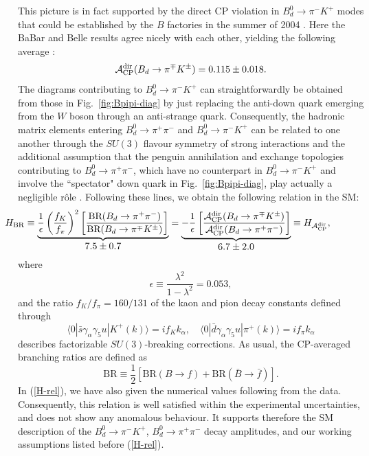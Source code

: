 \documentclass[11pt]{cernrep}
\begin{document}
This picture is in fact supported by the direct CP violation in $B^0_d\to\pi^-K^+$ 
modes that could be established by the $B$ factories in 
the summer of 2004 \cite{CP-B-dir}. Here the BaBar and Belle results agree 
nicely with each other, yielding the following average \cite{HFAG}:
\begin{equation}\label{AdirBdpimKp-exp}
{\cal A}_{\rm CP}^{\rm dir}(B_d\to\pi^\mp K^\pm)=0.115\pm 0.018.
\end{equation}
The diagrams contributing to $B^0_d\to\pi^-K^+$ can straightforwardly be 
obtained from those in Fig.~\ref{fig:Bpipi-diag} by just replacing the anti-down quark
emerging from the $W$ boson through an anti-strange quark. Consequently, the 
hadronic matrix elements entering $B^0_d\to\pi^+\pi^-$ and $B^0_d\to\pi^-K^+$ can be 
related to one another through the $SU(3)$ flavour symmetry of strong interactions
and the additional assumption that the penguin annihilation and exchange topologies
contributing to $B^0_d\to\pi^+\pi^-$, which have no counterpart in 
$B^0_d\to\pi^-K^+$ and involve the ``spectator" down quark in 
Fig.~\ref{fig:Bpipi-diag}, play actually a negligible r\^ole \cite{RF-Bpipi}. Following 
these lines, we obtain the following relation in the SM:
\begin{equation}\label{H-rel}
\hspace*{-1.7truecm}
H_{\rm BR}\equiv\underbrace{\frac{1}{\epsilon}
\left(\frac{f_K}{f_\pi}\right)^2\left[\frac{\mbox{BR}
(B_d\to\pi^+\pi^-)}{\mbox{BR}(B_d\to\pi^\mp K^\pm)}
\right]}_{\mbox{$7.5\pm 0.7$}} =
\underbrace{-\frac{1}{\epsilon}\left[\frac{{\cal A}_{\rm CP}^{\rm dir}(B_d\to\pi^\mp 
K^\pm)}{{\cal A}_{\rm CP}^{\rm dir}(B_d\to\pi^+\pi^-)}
\right]}_{\mbox{$6.7\pm 2.0$}} \equiv H_{{\cal A}_{\rm CP}^{\rm dir}},
\end{equation}
where 
\begin{equation}\label{eps-def}
\epsilon\equiv\frac{\lambda^2}{1-\lambda^2}=0.053, 
\end{equation}
and the ratio $f_K/f_\pi=160/131$ of the kaon and pion decay constants
defined through
\begin{equation}\label{decay-const-def}
\langle 0|\bar s \gamma_\alpha\gamma_5 u|K^+(k)\rangle=
i f_K k_\alpha, \quad
\langle 0|\bar d \gamma_\alpha\gamma_5 u|\pi^+(k)\rangle=
i f_\pi k_\alpha
\end{equation}
describes
factorizable $SU(3)$-breaking corrections. As usual, the CP-averaged 
branching ratios are defined as
\begin{equation}
\mbox{BR}\equiv\frac{1}{2}\left[\mbox{BR}(B\to f)+
\mbox{BR}(\bar B\to \bar f)\right].
\end{equation}
In (\ref{H-rel}), we have also given the
numerical values following from the data. Consequently, this relation 
is well satisfied within the experimental uncertainties, and does not
show any anomalous behaviour. It supports therefore the SM description
of the $B^0_d\to\pi^-K^+$, $B^0_d\to\pi^+\pi^-$ decay amplitudes,
and our working assumptions listed before (\ref{H-rel}). 
\end{document}
